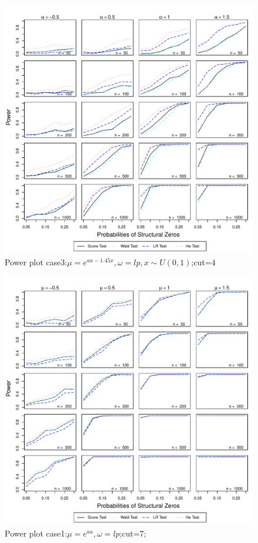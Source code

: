 \documentclass[11pt]{article}
\numberwithin{equation}{section}
\begin{document}
\begin{figure}
  \centering
  \includegraphics[width=\columnwidth]{./figure/p/p43.pdf}
  \caption{Power plot case3:$\mu=e^{aa-1.45x},\omega=lp,x\sim U(0,1)$;cut=4}
\end{figure}


\begin{figure}
  \centering
  \includegraphics[width=\columnwidth]{./figure/p/p71.pdf}
  \caption{Power plot case1:$\mu=e^{aa},\omega=lp$;cut=7;}
\end{figure}
\end{document}
